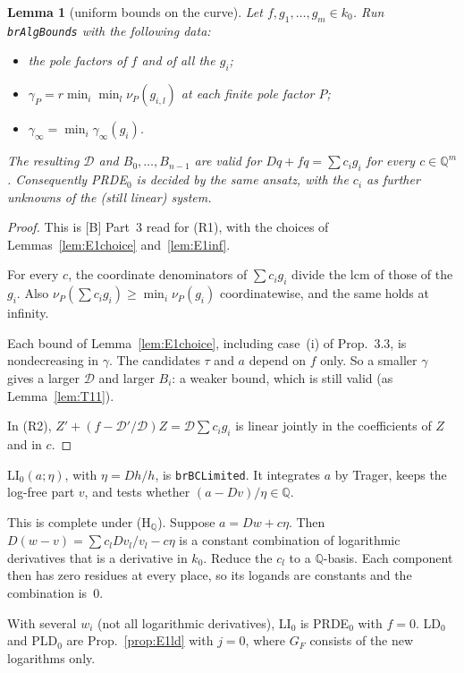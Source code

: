 \documentclass[11pt]{article}
\newtheorem{lemma}[theorem]{Lemma}
\theoremstyle{definition}
\theoremstyle{remark}
\newcommand{\Q}{\mathbb{Q}}
\newcommand{\code}[1]{\texttt{#1}}
\begin{document}
\begin{lemma}[uniform bounds on the curve]\label{lem:E1uniform}
Let $f,g_1,\dots,g_m\in k_0$. Run \code{brAlgBounds} with the following data:
\begin{itemize}
\item the pole factors of $f$ and of all the $g_i$;
\item $\gamma_P=r\min_i\min_l\nu_P(g_{i,l})$ at each finite pole factor $P$;
\item $\gamma_\infty=\min_i\gamma_\infty(g_i)$.
\end{itemize}
The resulting $\mathcal D$ and $B_0,\dots,B_{n-1}$ are valid for $Dq+fq=\sum c_ig_i$ for every
$c\in\Q^m$. Consequently PRDE$_0$ is decided by the same ansatz, with the $c_i$ as further
unknowns of the (still linear) system.
\end{lemma}
\begin{proof}
This is [B] Part~3 read for (R1), with the choices of Lemmas~\ref{lem:E1choice}
and~\ref{lem:E1inf}.

For every $c$, the coordinate denominators of $\sum c_ig_i$ divide the lcm of those of the
$g_i$. Also $\nu_P(\sum c_ig_i)\ge\min_i\nu_P(g_i)$ coordinatewise, and the same holds at
infinity.

Each bound of Lemma~\ref{lem:E1choice}, including case~(i) of Prop.~3.3, is nondecreasing in
$\gamma$. The candidates $\tau$ and $a$ depend on $f$ only. So a smaller $\gamma$ gives a larger
$\mathcal D$ and larger $B_i$: a weaker bound, which is still valid (as Lemma~\ref{lem:T11}).

In (R2), $Z'+(f-\mathcal D'/\mathcal D)Z=\mathcal D\sum c_ig_i$ is linear jointly in the
coefficients of $Z$ and in $c$.
\end{proof}

LI$_0(a;\eta)$, with $\eta=Dh/h$, is \code{brBCLimited}. It integrates $a$ by Trager, keeps the
log-free part $v$, and tests whether $(a-Dv)/\eta\in\Q$.

This is complete under (H$_\Q$). Suppose $a=Dw+c\eta$. Then $D(w-v)=\sum c_lDv_l/v_l-c\eta$ is
a constant combination of logarithmic derivatives that is a derivative in $k_0$. Reduce the
$c_l$ to a $\Q$-basis. Each component then has zero residues at every place, so its logands are
constants and the combination is~$0$.

With several $w_i$ (not all logarithmic derivatives), LI$_0$ is PRDE$_0$ with $f=0$. LD$_0$ and
PLD$_0$ are Prop.~\ref{prop:E1ld} with $j=0$, where $G_F$ consists of the new logarithms only.
\end{document}
